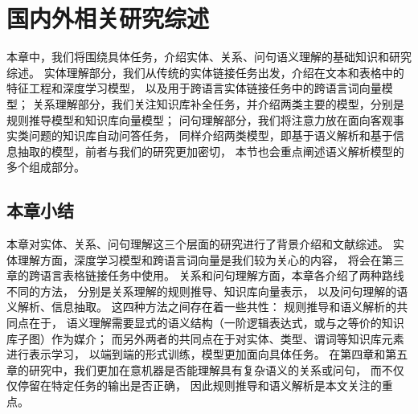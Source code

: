 
\chapter{国内外相关研究综述}
\label{chap:rw}


本章中，我们将围绕具体任务，介绍实体、关系、问句语义理解的基础知识和研究综述。
实体理解部分，我们从传统的实体链接任务出发，介绍在文本和表格中的特征工程和深度学习模型，
以及用于跨语言实体链接任务中的跨语言词向量模型；
关系理解部分，我们关注知识库补全任务，并介绍两类主要的模型，分别是规则推导模型和知识库向量模型；
问句理解部分，我们将注意力放在面向客观事实类问题的知识库自动问答任务，
同样介绍两类模型，即基于语义解析和基于信息抽取的模型，前者与我们的研究更加密切，
本节也会重点阐述语义解析模型的多个组成部分。




\section{本章小结}
\label{chap:rw-summary}

本章对实体、关系、问句理解这三个层面的研究进行了背景介绍和文献综述。
实体理解方面，深度学习模型和跨语言词向量是我们较为关心的内容，
将会在第三章的跨语言表格链接任务中使用。
关系和问句理解方面，本章各介绍了两种路线不同的方法，
分别是关系理解的规则推导、知识库向量表示，
以及问句理解的语义解析、信息抽取。
这四种方法之间存在着一些共性：
规则推导和语义解析的共同点在于，
语义理解需要显式的语义结构（一阶逻辑表达式，或与之等价的知识库子图）作为媒介；
而另外两者的共同点在于对实体、类型、谓词等知识库元素进行表示学习，
以端到端的形式训练，模型更加面向具体任务。
在第四章和第五章的研究中，我们更加在意机器是否能理解具有复杂语义的关系或问句，
而不仅仅停留在特定任务的输出是否正确，
因此规则推导和语义解析是本文关注的重点。
